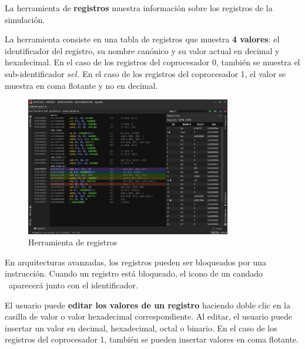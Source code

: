 La herramienta de \textbf{registros} muestra información sobre
los registros de la simulación.

\noindent La herramienta consiste en una tabla de registros
que muestra \textbf{4 valores}: el identificador del registro,
su nombre canónico y su valor actual en decimal y hexadecimal.
En el caso de los registros del coprocesador 0,
también se muestra el sub-identificador $sel$.
En el caso de los registros del coprocesador 1,
el valor se muestra en coma flotante y no en decimal.

\begin{figure}[H]
    \centering
    \includegraphics[width=0.8\textwidth]{images/tools/jams-registers}
    \caption{Herramienta de registros}
    \label{fig:jams-registers}
\end{figure}

\noindent En arquitecturas avanzadas, los registros pueden ser
bloqueados por una instrucción.
Cuando un registro está bloqueado, el icono de un candado \faLock \
aparecerá junto con el identificador.

\noindent El usuario puede \textbf{editar los valores de un registro}
haciendo doble clic en la casilla de valor
o valor hexadecimal correspondiente.
Al editar, el usuario puede insertar un valor en decimal,
hexadecimal, octal o binario.
En el caso de los registros del coprocesador 1,
también se pueden insertar valores en coma flotante.